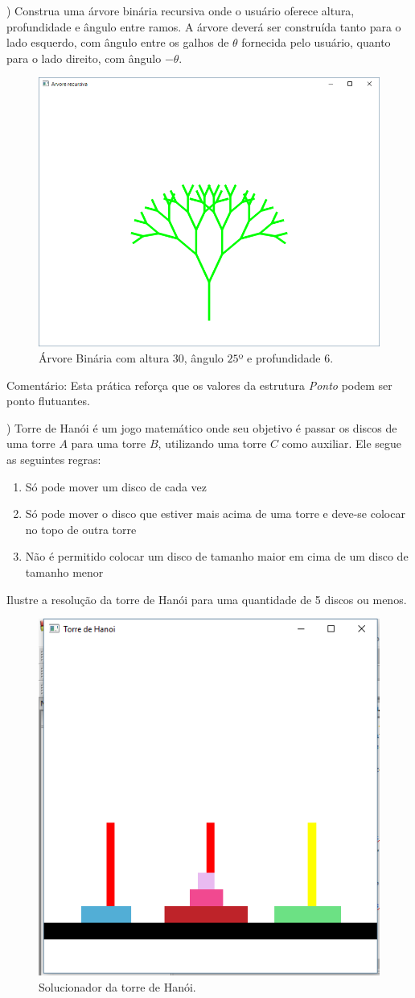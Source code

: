\begin{renumerate}

\item)
Construa uma árvore binária recursiva onde o usuário oferece altura, profundidade e ângulo entre ramos. A árvore deverá ser construída tanto para o lado esquerdo, com ângulo entre os galhos de $\theta$ fornecida pelo usuário, quanto para o lado direito, com ângulo $-\theta$.
  \label{ex:cap04_ex2}

  \begin{figure}[H]
    \centerline{\includegraphics[width=.3\textwidth]{img/cap4_ex17.png}}
    \caption{Árvore Binária com altura $30$, ângulo $25$º e profundidade $6$.}
    \label{fig:cap04_ex2}
  \end{figure}

  Comentário: Esta prática reforça que os valores da estrutura \emph{Ponto} podem ser ponto flutuantes.
%

\item)
Torre de Hanói é um jogo matemático onde seu objetivo é passar os discos de uma torre $A$ para uma torre $B$, utilizando uma torre $C$ como auxiliar. Ele segue as seguintes regras:
  \begin{enumerate}
    \item Só pode mover um disco de cada vez
    \item Só pode mover o disco que estiver mais acima de uma torre e deve-se colocar no topo de outra torre
    \item Não é permitido colocar um disco de tamanho maior em cima de um disco de tamanho menor
  \end{enumerate}

  Ilustre a resolução da torre de Hanói para uma quantidade de 5 discos ou menos.
  \label{ex:cap04_ex1}

  \begin{figure}[H]
    \centerline{\includegraphics[width=.3\textwidth]{img/cap4_ex13.png}}
    \caption{Solucionador da torre de Hanói.}
    \label{fig:cap04_ex1}
  \end{figure}


\end{renumerate}
